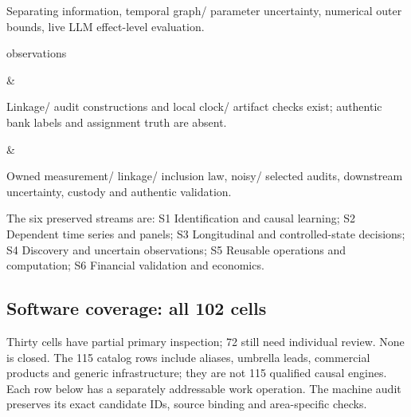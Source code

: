 \documentclass[
  10pt,
]{article}
\begin{document}
\begin{longtable}[]
\begin{minipage}[t]{\linewidth}
Separating information, temporal graph/ parameter uncertainty, numerical
outer bounds, live LLM effect-level evaluation.\strut
\end{minipage}\tabularnewline
\begin{minipage}[t]{\linewidth}\raggedright
observations\strut
\end{minipage} & \begin{minipage}[t]{\linewidth}\raggedright
Linkage/ audit constructions and local clock/ artifact checks exist;
authentic bank labels and assignment truth are absent.\strut
\end{minipage} & \begin{minipage}[t]{\linewidth}\raggedright
Owned measurement/ linkage/ inclusion law, noisy/ selected audits,
downstream uncertainty, custody and authentic validation.\strut
\end{minipage}\tabularnewline
\bottomrule
\end{longtable}

The six preserved streams are: S1 Identification and causal learning; S2
Dependent time series and panels; S3 Longitudinal and controlled-state
decisions; S4 Discovery and uncertain observations; S5 Reusable
operations and computation; S6 Financial validation and economics.

\hypertarget{software-coverage-all-102-cells}{%
\subsection{Software coverage: all 102
cells}\label{software-coverage-all-102-cells}}

Thirty cells have partial primary inspection; 72 still need individual
review. None is closed. The 115 catalog rows include aliases, umbrella
leads, commercial products and generic infrastructure; they are not 115
qualified causal engines. Each row below has a separately addressable
work operation. The machine audit preserves its exact candidate IDs,
source binding and area-specific checks.
\end{document}

